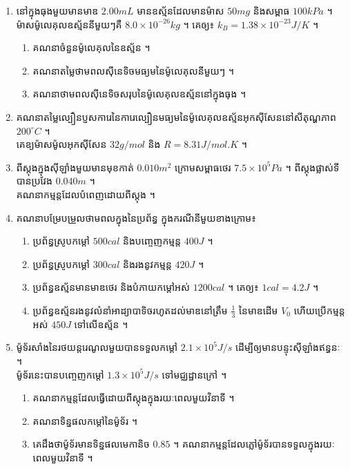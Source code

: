 \documentclass{officialexam}
\begin{document}
\begin{enumerate}[I]
	\item នៅក្នុងធុងមួយមានមាឌ $2.00mL$ មានឧស្ម័នដែលមានម៉ាស $50mg$ និងសម្ពាធ $100kPa$ ។ \\ម៉ាសម៉ូលេគុលឧស្ម័ននីមួយៗគឺ $8.0\times10^{-26}kg$ ។ គេឲ្យ៖  $k_B=1.38\times10^{-23}J/K$ ។
	\begin{enumerate}[k]
		\item គណនាចំនួនម៉ូលេគុលនៃឧស្ម័ន ។
		\item គណនាតម្លៃថាមពលស៊ីនេទិចមធ្យមនៃម៉ូលេគុលនីមួយៗ ។
		\item គណនាថាមពលស៊ីនេទិចសរុបនៃម៉ូលេគុលឧស្ម័ននៅក្នុងធុង ។
	\end{enumerate}
	\item គណនាតម្លៃល្បឿនប្ញសការេនៃការេល្បឿនមធ្យមនៃម៉ូលេគុលឧស្ម័នអុកស៊ីសែននៅសីតុណ្ហភាព $200^\circ C$ ។ \\គេឧ្យម៉ាសម៉ូលអុកស៊ីសែន $32g/mol$ និង $R=8.31J/mol.K$ ។
	\item ពីស្តុងក្នុងស៊ីឡាំងមួយមានមុខកាត់ $0.010 m^2$ ក្រោមសម្ពាធថេរ $7.5\times10^5 Pa$ ។ ពីស្តុងផ្លាស់ទីបានប្រវែង $0.040 m$ ។\\ គណនាកម្មន្តដែលបំពេញដោយពីស្តុង ។
	\item គណនាបម្រែបម្រួលថាមពលក្នុងនៃប្រព័ន្ធ ក្នុងករណីនីមួយខាងក្រោម៖ 
	\begin{enumerate}[k]
		\item ប្រព័ន្ធស្រូបកម្តៅ $500 cal$ និងបញ្ចេញកម្មន្ត $400 J$ ។
		\item ប្រព័ន្ធស្រូបកម្តៅ $300 cal$ និងរងនូវកម្មន្ត $420 J$ ។
		\item ប្រព័ន្ធឧស្ម័នមានមាឌថេរ និងបំភាយកម្តៅអស់ $1200 cal$ ។ គេឲ្យ៖ $1 cal =4.2 J$ ។
		\item ប្រព័ន្ធឧស្ម័នរងនូវលំនាំអាដ្យាបាទិចរហូតដល់មាឌនៅត្រឹម $\frac{1}{3}$ នៃមាឌដើម $V_0$ ហើយប្រើកម្មន្តអស់ $450J$ ទៅលើឧស្ម័ន ។
	\end{enumerate}
		\item ម៉ូទ័រសាំងនៃរថយន្តរេណូលមួយបានទទួលកម្តៅ $2.1\times10^5J/s$ ដើម្បីឲ្យមានបន្ទុះស៊ីឡាំងឥន្ធនៈ ។\\ ម៉ូទ័រនេះបានបញ្ចេញកម្តៅ $1.3\times10^5J/s$ ទៅមជ្ឈដ្ឋានក្រៅ ។
	\begin{enumerate}[k]
		\item គណនាកម្មន្តដែលធ្វើដោយពីស្តុងក្នុងរយៈពេលមួយវិនាទី ។
		\item គណនាទិន្នផលកម្តៅនៃម៉ូទ័រ ។
		\item គេដឹងថាម៉ូទ័រមានទិន្នផលមេកានិច $0.85$ ។ គណនាកម្មន្តដែលភ្លៅម៉ូទ័របានទទួលក្នុងរយៈពេលមួយវិនាទី ។
	\end{enumerate}

\end{enumerate}
\end{document}
